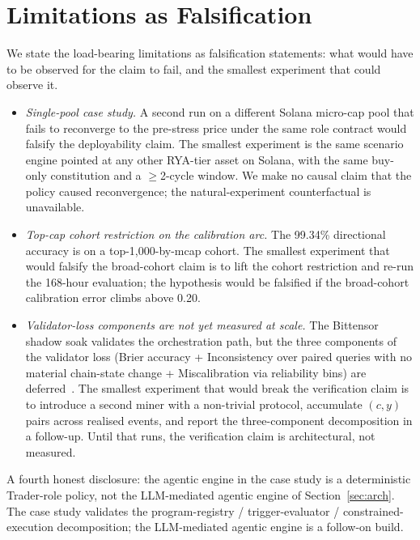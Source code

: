 \documentclass[11pt,a4paper]{article}
\begin{document}
\section{Limitations as Falsification}\label{sec:limits}

We state the load-bearing limitations as falsification statements:
what would have to be observed for the claim to fail, and the smallest
experiment that could observe it.

\begin{itemize}
  \item \emph{Single-pool case study.} A second run on a different
        Solana micro-cap pool that fails to reconverge to the
        pre-stress price under the same role contract would falsify
        the deployability claim. The smallest experiment is the same
        scenario engine pointed at any other RYA-tier asset on Solana,
        with the same buy-only constitution and a $\geq$2-cycle window.
        We make no causal claim that the policy caused reconvergence;
        the natural-experiment counterfactual is unavailable.
  \item \emph{Top-cap cohort restriction on the calibration arc.} The
        99.34\% directional accuracy is on a top-1{,}000-by-mcap
        cohort. The smallest experiment that would falsify the
        broad-cohort claim is to lift the cohort restriction and re-run
        the 168-hour evaluation; the hypothesis would be falsified if
        the broad-cohort calibration error climbs above 0.20.
  \item \emph{Validator-loss components are not yet measured at
        scale.} The Bittensor shadow soak validates the
        orchestration path, but the three components of the validator
        loss (Brier accuracy + Inconsistency over paired queries with
        no material chain-state change + Miscalibration via reliability
        bins) are deferred~\cite{omnirisk2026soak}. The smallest
        experiment that would break the verification claim is to
        introduce a second miner with a non-trivial protocol, accumulate
        $(c, y)$ pairs across realised events, and report the
        three-component decomposition in a follow-up. Until that runs,
        the verification claim is architectural, not measured.
\end{itemize}

A fourth honest disclosure: the agentic engine in the case study is a
deterministic Trader-role policy, not the LLM-mediated agentic engine of
Section~\ref{sec:arch}. The case study validates the
program-registry / trigger-evaluator / constrained-execution
decomposition; the LLM-mediated agentic engine is a follow-on build.
\end{document}
